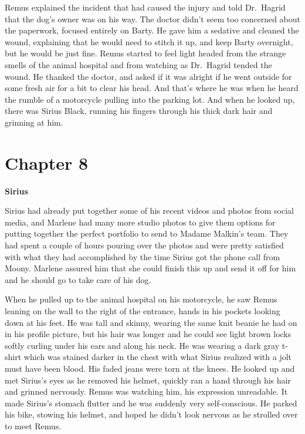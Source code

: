 \documentclass[12pt,twoside,openright]{memoir}
\begin{document}
Remus explained the incident that had caused the injury and told Dr.\ Hagrid that the dog's owner was on his way. The doctor didn't seem too concerned about the paperwork, focused entirely on Barty. He gave him a sedative and cleaned the wound, explaining that he would need to stitch it up, and keep Barty overnight, but he would be just fine. Remus started to feel light headed from the strange smells of the animal hospital and from watching as Dr.\ Hagrid tended the wound. He thanked the doctor, and asked if it was alright if he went outside for some fresh air for a bit to clear his head. And that's where he was when he heard the rumble of a motorcycle pulling into the parking lot. And when he looked up, there was Sirius Black, running his fingers through his thick dark hair and grinning at him. 

\chapter*{Chapter 8}

\textbf{Sirius} 

Sirius had already put together some of his recent videos and photos from social media, and Marlene had many more studio photos to give them options for putting together the perfect portfolio to send to Madame Malkin's team. They had spent a couple of hours pouring over the photos and were pretty satisfied with what they had accomplished by the time Sirius got the phone call from Moony. Marlene assured him that she could finish this up and send it off for him and he should go to take care of his dog.

When he pulled up to the animal hospital on his motorcycle, he saw Remus leaning on the wall to the right of the entrance, hands in his pockets looking down at his feet. He was tall and skinny, wearing the same knit beanie he had on in his profile picture, but his hair was longer and he could see light brown locks softly curling under his ears and along his neck. He was wearing a dark gray t-shirt which was stained darker in the chest with what Sirius realized with a jolt must have been blood. His faded jeans were torn at the knees. He looked up and met Sirius's eyes as he removed his helmet, quickly ran a hand through his hair and grinned nervously. Remus was watching him, his expression unreadable. It made Sirius's stomach flutter and he was suddenly very self-conscious. He parked his bike, stowing his helmet, and hoped he didn't look nervous as he strolled over to meet Remus.
\end{document}
